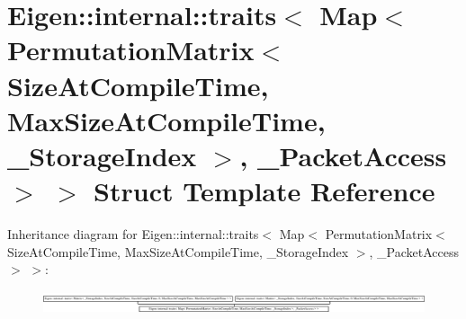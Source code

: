 \hypertarget{struct_eigen_1_1internal_1_1traits_3_01_map_3_01_permutation_matrix_3_01_size_at_compile_time_0013e0044a37b24d59a079ebbe4c707a56}{}\section{Eigen\+:\+:internal\+:\+:traits$<$ Map$<$ Permutation\+Matrix$<$ Size\+At\+Compile\+Time, Max\+Size\+At\+Compile\+Time, \+\_\+\+Storage\+Index $>$, \+\_\+\+Packet\+Access $>$ $>$ Struct Template Reference}
\label{struct_eigen_1_1internal_1_1traits_3_01_map_3_01_permutation_matrix_3_01_size_at_compile_time_0013e0044a37b24d59a079ebbe4c707a56}
Inheritance diagram for Eigen\+:\+:internal\+:\+:traits$<$ Map$<$ Permutation\+Matrix$<$ Size\+At\+Compile\+Time, Max\+Size\+At\+Compile\+Time, \+\_\+\+Storage\+Index $>$, \+\_\+\+Packet\+Access $>$ $>$\+:\begin{figure}[H]
\begin{center}
\leavevmode
\includegraphics[height=0.678788cm]{struct_eigen_1_1internal_1_1traits_3_01_map_3_01_permutation_matrix_3_01_size_at_compile_time_0013e0044a37b24d59a079ebbe4c707a56}
\end{center}
\end{figure}
